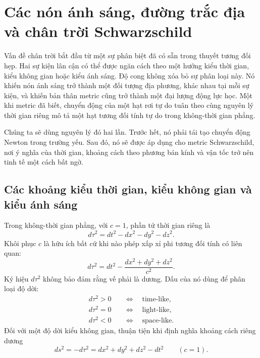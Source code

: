 \chapter{Các nón ánh sáng, đường trắc địa và chân trời Schwarzschild}

Vấn đề chân trời bắt đầu từ một sự phân biệt đã có sẵn trong thuyết tương đối hẹp. Hai sự kiện lân cận có thể được ngăn cách theo một hướng kiểu thời gian, kiểu không gian hoặc kiểu ánh sáng. Độ cong không xóa bỏ sự phân loại này. Nó khiến nón ánh sáng trở thành một đối tượng địa phương, khác nhau tại mỗi sự kiện, và khiến bản thân metric cũng trở thành một đại lượng động lực học. Một khi metric đã biết, chuyển động của một hạt rơi tự do tuân theo cùng nguyên lý thời gian riêng mô tả một hạt tương đối tính tự do trong không-thời gian phẳng.

Chúng ta sẽ dùng nguyên lý đó hai lần. Trước hết, nó phải tái tạo chuyển động Newton trong trường yếu. Sau đó, nó sẽ được áp dụng cho metric Schwarzschild, nơi ý nghĩa của thời gian, khoảng cách theo phương bán kính và vận tốc trở nên tinh tế một cách bất ngờ.

\section{Các khoảng kiểu thời gian, kiểu không gian và kiểu ánh sáng}

Trong không-thời gian phẳng, với \(c=1\), phần tử thời gian riêng là
\begin{equation}
d\tau^2=dt^2-dx^2-dy^2-dz^2.
\label{eq:l5-minkowski-proper-time}
\end{equation}
Khôi phục \(c\) là hữu ích bất cứ khi nào phép xấp xỉ phi tương đối tính có liên quan:
\begin{equation}
d\tau^2
=dt^2-\frac{dx^2+dy^2+dz^2}{c^2}.
\label{eq:l5-minkowski-c}
\end{equation}
Ký hiệu \(d\tau^2\) không bảo đảm rằng vế phải là dương. Dấu của nó dùng để phân loại độ dời:
\begin{align}
d\tau^2>0
&\quad\Longleftrightarrow\quad \text{time-like},\\
d\tau^2=0
&\quad\Longleftrightarrow\quad \text{light-like},\\
d\tau^2<0
&\quad\Longleftrightarrow\quad \text{space-like}.
\end{align}
Đối với một độ dời kiểu không gian, thuận tiện khi định nghĩa khoảng cách riêng dương
\begin{equation}
ds^2=-d\tau^2
=dx^2+dy^2+dz^2-dt^2
\qquad(c=1).
\label{eq:l5-proper-distance}
\end{equation}

